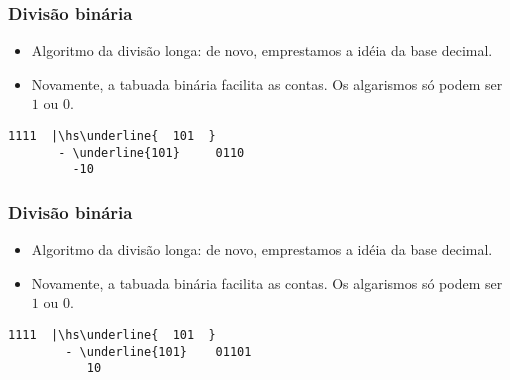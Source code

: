 \documentclass{beamer}
\begin{document}
\begin{frame}[fragile]
\frametitle{Divisão binária}

\begin{itemize}
\item Algoritmo da divisão longa: de novo, emprestamos a idéia da base decimal.

\item Novamente, a tabuada binária facilita as contas. Os algarismos só podem ser $1$ ou $0$.
\end{itemize}

\def\hs{\hspace{-1mm}}

\begin{Verbatim}[commandchars=\\\{\},codes={\catcode`$=3\catcode`^=7}]
          1111  |\hs\underline{  101  }
       - \underline{101}     0110
         -10  
\end{Verbatim}

\end{frame}


\begin{frame}[fragile]
\frametitle{Divisão binária}

\begin{itemize}
\item Algoritmo da divisão longa: de novo, emprestamos a idéia da base decimal.

\item Novamente, a tabuada binária facilita as contas. Os algarismos só podem ser $1$ ou $0$.
\end{itemize}

\def\hs{\hspace{-1mm}}

\begin{Verbatim}[commandchars=\\\{\},codes={\catcode`$=3\catcode`^=7}]
          1111  |\hs\underline{  101  }
        - \underline{101}    01101
           10  
\end{Verbatim}

\end{frame}

\end{document}
